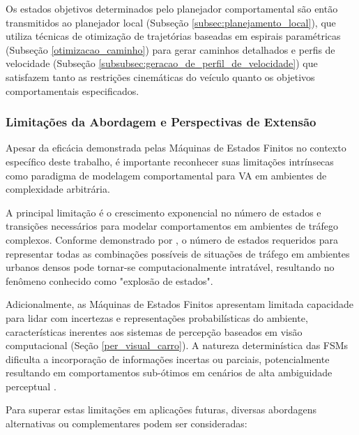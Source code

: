 Os estados objetivos determinados pelo planejador comportamental são então transmitidos ao planejador local (Subseção \ref{subsec:planejamento_local}), que utiliza técnicas de otimização de trajetórias baseadas em espirais paramétricas (Subseção \ref{otimizacao_caminho}) para gerar caminhos detalhados e perfis de velocidade (Subseção \ref{subsubsec:geracao_de_perfil_de_velocidade}) que satisfazem tanto as restrições cinemáticas do veículo quanto os objetivos comportamentais especificados.

\subsubsection{Limitações da Abordagem e Perspectivas de Extensão}

Apesar da eficácia demonstrada pelas Máquinas de Estados Finitos no contexto específico deste trabalho, é importante reconhecer suas limitações intrínsecas como paradigma de modelagem comportamental para VA em ambientes de complexidade arbitrária.

A principal limitação é o crescimento exponencial no número de estados e transições necessários para modelar comportamentos em ambientes de tráfego complexos. Conforme demonstrado por , o número de estados requeridos para representar todas as combinações possíveis de situações de tráfego em ambientes urbanos densos pode tornar-se computacionalmente intratável, resultando no fenômeno conhecido como "explosão de estados".

Adicionalmente, as Máquinas de Estados Finitos apresentam limitada capacidade para lidar com incertezas e representações probabilísticas do ambiente, características inerentes aos sistemas de percepção baseados em visão computacional (Seção \ref{per_visual_carro}). A natureza determinística das FSMs dificulta a incorporação de informações incertas ou parciais, potencialmente resultando em comportamentos sub-ótimos em cenários de alta ambiguidade perceptual \cite{University_of_Toronto2018-mp}.

Para superar estas limitações em aplicações futuras, diversas abordagens alternativas ou complementares podem ser consideradas:


